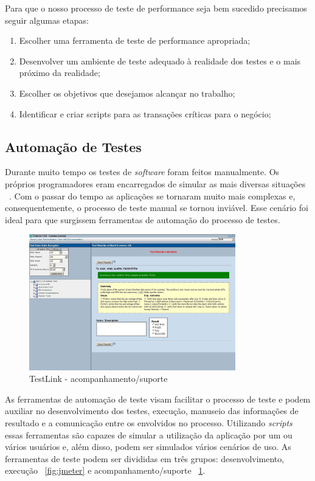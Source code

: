 Para que o nosso processo de teste de performance seja bem sucedido precisamos seguir algumas etapas:

\begin{enumerate}
\item Escolher uma ferramenta de teste de performance apropriada;
\item Desenvolver um ambiente de teste adequado à realidade dos testes e o mais próximo da realidade;
\item Escolher os objetivos que desejamos alcançar no trabalho;
\item Identificar e criar scripts para as transações críticas para o negócio;
\end{enumerate}


\subsection{Automação de Testes}

Durante muito tempo os testes de \textit{software} foram feitos manualmente. Os próprios programadores eram encarregados de simular as mais diversas situações ~\cite{rios2006teste}. Com o passar do tempo as aplicações se tornaram muito mais complexas e, consequentemente, o processo de teste manual se tornou inviável. Esse cenário foi ideal para que surgissem ferramentas de automação do processo de testes.

	\begin{figure}[!htbp]
		\begin{center}
			\includegraphics[width=0.8\textwidth]{testlink}
		\end{center}
		\caption{TestLink - acompanhamento/suporte ~\cite{siteTestLink}}
		\label{fig:testlink}
	\end{figure}

As ferramentas de automação de teste visam facilitar o processo de teste e podem auxiliar no desenvolvimento dos testes, execução, manuseio das informações de resultado e a comunicação entre os envolvidos no processo. Utilizando \textit{scripts} essas ferramentas são capazes de simular a utilização da aplicação por um ou vários usuários e, além disso, podem ser simulados vários cenários de uso. As ferramentas de teste podem ser divididas em três grupos: desenvolvimento, execução ~\ref{fig:jmeter} e acompanhamento/suporte ~\ref{fig:testlink}.

